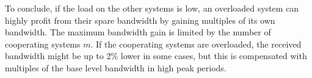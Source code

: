 To conclude, if the load on the other systems is low, an overloaded system can highly profit from their spare bandwidth by gaining multiples of its own bandwidth. The maximum bandwidth gain is limited by the number of cooperating systems $m$.
If the cooperating systems are overloaded, the received bandwidth might be up to 2\% lower in some cases, but this is compensated with multiples of the base level bandwidth in high peak periods.



